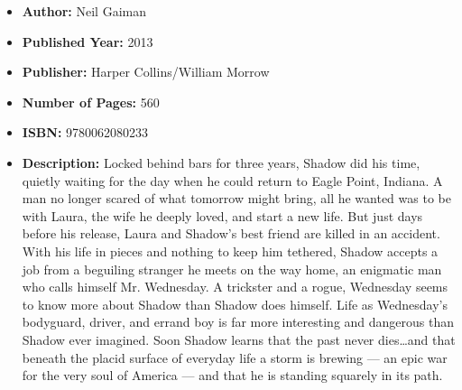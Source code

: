 \documentclass{tufte-handout}
\begin{document}
\begin{itemize}
    \item[] \textbf{Author:} Neil Gaiman
    \item[] \textbf{Published Year:} 2013
    \item[] \textbf{Publisher:} Harper Collins/William Morrow
    \item[] \textbf{Number of Pages:} 560      
    \item[] \textbf{ISBN:} 9780062080233
    \item[] \textbf{Description:} Locked behind bars for three years, Shadow did his time, quietly waiting for the day when he could return to Eagle Point, Indiana. A man no longer scared of what tomorrow might bring, all he wanted was to be with Laura, the wife he deeply loved, and start a new life. But just days before his release, Laura and Shadow’s best friend are killed in an accident. With his life in pieces and nothing to keep him tethered, Shadow accepts a job from a beguiling stranger he meets on the way home, an enigmatic man who calls himself Mr. Wednesday. A trickster and a rogue, Wednesday seems to know more about Shadow than Shadow does himself. Life as Wednesday’s bodyguard, driver, and errand boy is far more interesting and dangerous than Shadow ever imagined. Soon Shadow learns that the past never dies\ldots and that beneath the placid surface of everyday life a storm is brewing --- an epic war for the very soul of America --- and that he is standing squarely in its path.
\end{itemize}
\end{document}
